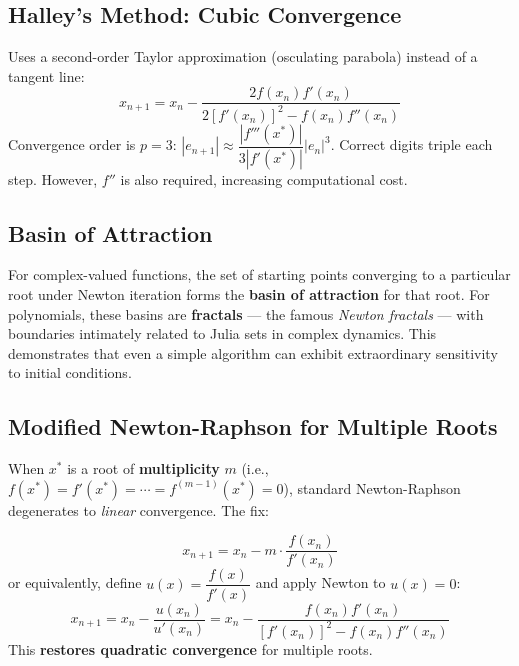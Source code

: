 \documentclass[12pt]{article}
\begin{document}
\subsection*{Halley's Method: Cubic Convergence}

\begin{defbox}
Uses a second-order Taylor approximation (osculating parabola) instead of a tangent line:
\[
  x_{n+1} = x_n - \frac{2f(x_n)f'(x_n)}{2[f'(x_n)]^2 - f(x_n)f''(x_n)}
\]
Convergence order is $p=3$: $|e_{n+1}|\approx \dfrac{|f'''(x^*)|}{3|f'(x^*)|}|e_n|^3$. Correct digits triple each step. However, $f''$ is also required, increasing computational cost.
\end{defbox}

\subsection*{Basin of Attraction}

For complex-valued functions, the set of starting points converging to a particular root under Newton iteration forms the \textbf{basin of attraction} for that root. For polynomials, these basins are \textbf{fractals} — the famous \textit{Newton fractals} — with boundaries intimately related to Julia sets in complex dynamics. This demonstrates that even a simple algorithm can exhibit extraordinary sensitivity to initial conditions.

\subsection*{Modified Newton-Raphson for Multiple Roots}

When $x^*$ is a root of \textbf{multiplicity} $m$ (i.e., $f(x^*) = f'(x^*) = \cdots = f^{(m-1)}(x^*) = 0$), standard Newton-Raphson degenerates to \textit{linear} convergence. The fix:

\begin{defbox}
\[
  x_{n+1} = x_n - m\cdot\frac{f(x_n)}{f'(x_n)}
\]
or equivalently, define $u(x) = \dfrac{f(x)}{f'(x)}$ and apply Newton to $u(x) = 0$:
\[
  x_{n+1} = x_n - \frac{u(x_n)}{u'(x_n)} = x_n - \frac{f(x_n)f'(x_n)}{[f'(x_n)]^2 - f(x_n)f''(x_n)}
\]
This \textbf{restores quadratic convergence} for multiple roots.
\end{defbox}

\bigskip
\end{document}
